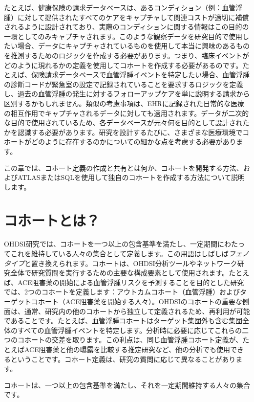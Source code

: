 \documentclass[
  11pt]{book}
\makeatletter
\newenvironment{kframe}{%
\medskip{}
\setlength{\fboxsep}{.8em}
 \def\at@end@of@kframe{}%
 \ifinner\ifhmode%
  \def\at@end@of@kframe{\end{minipage}}%
  \begin{minipage}{\columnwidth}%
 \fi\fi%
 \def\FrameCommand##1{\hskip\@totalleftmargin \hskip-\fboxsep
 \colorbox{myShadeColor}{##1}\hskip-\fboxsep
     \hskip-\linewidth \hskip-\@totalleftmargin \hskip\columnwidth}%
 \MakeFramed {\advance\hsize-\width
   \@totalleftmargin\z@ \linewidth\hsize
   \@setminipage}}%
 {\par\unskip\endMakeFramed%
 \at@end@of@kframe}
\newenvironment{rmdblock}[1]
  {
  \begin{itemize}
  \renewcommand{\labelitemi}{
    \raisebox{-.7\height}[0pt][0pt]{
      {\setkeys{Gin}{width=3em,keepaspectratio}\texttt{[image: images/\#1]}}
    }
  }
  \setlength{\fboxsep}{1em}
  \begin{kframe}
  \item
  }
  {
  \end{kframe}
  \end{itemize}
  }
\newenvironment{rmdimportant}
  {\begin{rmdblock}{important}}
  {\end{rmdblock}}
\theoremstyle{definition}
\theoremstyle{definition}
\theoremstyle{definition}
\theoremstyle{definition}
\theoremstyle{remark}
\makeatother
\begin{document}
たとえば、健康保険の請求データベースは、あるコンディション（例：血管浮腫）に対して提供されたすべてのケアをキャプチャして関連コストが適切に補償されるように設計されており、実際のコンディションに関する情報はこの目的の一環としてのみキャプチャされます。このような観察データを研究目的で使用したい場合、データにキャプチャされているものを使用して本当に興味のあるものを推測するためのロジックを作成する必要があります。つまり、臨床イベントがどのように現れるかの定義を使用してコホートを作成する必要があるのです。たとえば、保険請求データベースで血管浮腫イベントを特定したい場合、血管浮腫の診断コードが緊急室の設定で記録されていることを要求するロジックを定義し、過去の血管浮腫の発生に対するフォローアップケアを単に説明する請求から区別するかもしれません。類似の考慮事項は、EHRに記録された日常的な医療の相互作用でキャプチャされるデータに対しても適用されます。データが二次的な目的で使用されているため、各データベースが元々何を目的として設計されたかを認識する必要があります。研究を設計するたびに、さまざまな医療環境でコホートがどのように存在するのかについての細かな点を考慮する必要があります。

この章では、コホート定義の作成と共有とは何か、コホートを開発する方法、およびATLASまたはSQLを使用して独自のコホートを作成する方法について説明します。

\section{コホートとは？}\label{ux30b3ux30dbux30fcux30c8ux3068ux306f}

OHDSI研究では、コホートを一つ以上の包含基準を満たし、一定期間にわたってこれを維持している人々の集合として定義します。この用語はしばしば\emph{フェノタイプ}と置き換えられます。コホートは、OHDSI分析ツールやネットワーク研究全体で研究質問を実行するための主要な構成要素として使用されます。たとえば、ACE阻害薬の開始による血管浮腫リスクを予測することを目的とした研究では、2つのコホートを定義します：アウトカムコホート（血管浮腫）およびターゲットコホート（ACE阻害薬を開始する人々）。OHDSIのコホートの重要な側面は、通常、研究内の他のコホートから独立して定義されるため、再利用が可能であることです。たとえば、血管浮腫コホートはターゲット集団外も含む集団全体のすべての血管浮腫イベントを特定します。分析時に必要に応じてこれらの二つのコホートの交差を取ります。この利点は、同じ血管浮腫コホート定義が、たとえばACE阻害薬と他の曝露を比較する推定研究など、他の分析でも使用できるということです。コホート定義は、研究の質問に応じて異なることがあります。

\begin{rmdimportant}
コホートは、一つ以上の包含基準を満たし、それを一定期間維持する人々の集合です。
\end{rmdimportant}
\end{document}
